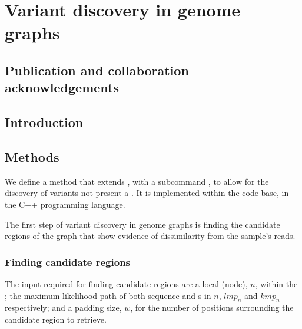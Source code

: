 
\chapter{Variant discovery in genome graphs}
\label{chap:denovo}
\ifpdf
    \graphicspath{{Chapter1/Figs/Raster/}{Chapter1/Figs/PDF/}{Chapter1/Figs/}}
\else
    \graphicspath{{Chapter1/Figs/Vector/}{Chapter1/Figs/}}
\fi
\setcounter{section}{-1}
\section{Publication and collaboration acknowledgements}
\label{sec:denovo-acknowledge}

\section{Introduction}

\section{Methods}
\label{sec:denovo-method}

We define a method that extends \pandora{}, with a subcommand , to allow for the \denovo{} discovery of variants not present a \prg{}. It is implemented within the \pandora{} code base, in the C++ programming language. 

The first step of \denovo{} variant discovery in genome graphs is finding the candidate regions of the graph that show evidence of dissimilarity from the sample's reads.

\subsection{Finding candidate regions}

The input required for finding candidate regions are a local \prg{} (node), $n$, within the \pandora{} \panrg{}; the maximum likelihood path of both sequence and \kmer{}s in $n$, $lmp_n$ and $kmp_n$ respectively; and a padding size, $w$, for the number of positions surrounding the candidate region to retrieve.

